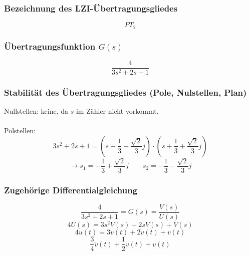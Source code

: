 \documentclass[a4paper,10pt,fleqn]{article}
\begin{document}
\subsubsection*{Bezeichnung des LZI-Übertragungsgliedes}
\[ PT_2 \]

\subsubsection*{Übertragungsfunktion $G(s)$}
\[ \frac{4}{3 s^2 + 2 s + 1} \]

\subsubsection*{Stabilität des Übertragungsgliedes (Pole, Nulstellen, Plan)}
Nullstellen: keine, da $s$ im Zähler nicht vorkommt. \\\\
Polstellen: 
\[ 3 s^2 + 2 s + 1 = \left(s + \frac{1}{3} - \frac{\sqrt{2}}{3}j\right) \cdot \left(s + \frac{1}{3} + \frac{\sqrt{2}}{3}j\right) \]
\[ \rightarrow s_1 = -\frac{1}{3} + \frac{\sqrt{2}}{3}j \qquad s_2 = -\frac{1}{3} - \frac{\sqrt{2}}{3}j \]
\begin{figure}[h!]
    \centering
\end{figure}

\subsubsection*{Zugehörige Differentialgleichung}
\[ \frac{4}{3 s^2 + 2 s + 1} = G(s) = \frac{V(s)}{U(s)} \]
\[ 4 U(s) = 3 s^2 V(s) + 2 s V(s) + V(s) \]
\[ 4 u(t) = 3 \ddot{v}(t) + 2 \dot{v}(t) + v(t) \]
\[ \frac{3}{4} \ddot{v}(t) + \frac{1}{2} \dot{v}(t) + v(t) \]
\end{document}
